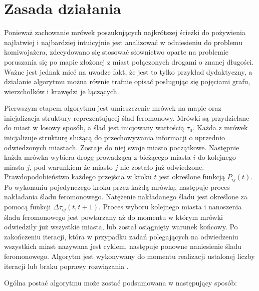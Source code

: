 {    %
    \section{Zasada działania}
    {
        Ponieważ zachowanie mrówek poszukujących najkrótszej ścieżki do pożywienia najłatwiej i najbardziej intuicyjnie
        jest analizować w odniesieniu do problemu komiwojażera, zdecydowano się stosować słownictwo oparte na problemie
        poruszania się po mapie złożonej z miast połączonych drogami o znanej długości. Ważne jest jednak mieć na uwadze
        fakt, że jest to tylko przykład dydaktyczny, a działanie algorytmu można równie trafnie opisać posługując się
        pojęciami grafu, wierzchołków i krawędzi je łączących.

        Pierwszym etapem algorytmu jest umieszczenie mrówek na mapie oraz inicjalizacja struktury reprezentującej ślad
        feromonowy. Mrówki są przydzielane do miast w losowy sposób, a ślad jest inicjowany wartością $\tau_0$. Każda z
        mrówek inicjalizuje strukturę służącą do przechowywania informacji o uprzednio odwiedzonych miastach. Zostaje do
        niej swoje miasto początkowe. Następnie każda mrówka wybiera drogę prowadzącą z bieżącego miasta $i$ do
        kolejnego miasta $j$, pod warunkiem że miasto $j$ nie zostało już odwiedzone. Prawdopodobieństwo każdego
        przejścia w kroku $t$ jest określone funkcją $P_{ij}(t)$. Po wykonaniu pojedynczego kroku przez każdą mrówkę,
        następuje proces nakładania śladu feromonowego. Natężenie nakładanego śladu jest określone za pomocą funkcji
        $\Delta\tau_{ij}(t, t+1)$. Proces wyboru kolejnego miasta i nanoszenia śladu feromonowego jest powtarzany aż do
        momentu w którym mrówki odwiedziły już wszystkie miasta, lub został osiągnięty warunek końcowy. Po zakończeniu
        iteracji, która w przypadku zadań polegających na odwiedzeniu wszystkich miast nazywana jest cyklem, następuje
        ponowne naniesienie śladu feromonowego. Algorytm jest wykonywany do momentu realizacji ustalonej liczby iteracji
        lub braku poprawy rozwiązania \cite{Dorigo1991AntSA}.

        Ogólna postać algorytmu może zostać podsumowana w następujący sposób:

}}

